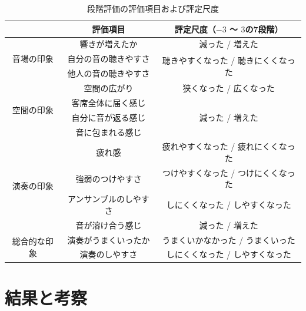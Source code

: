 \documentclass[11pt,a4j]{jreport}
\begin{document}
\vspace{1\baselineskip}

\begin{table}[H]
  \centering
  \caption{段階評価の評価項目および評定尺度}
  \label{tab:段階評価の評価項目および評定尺度}

  \begingroup
  \renewcommand{\arraystretch}{1.2}
  \begin{tabular}{c|c|c}
    & 評価項目 & 評定尺度（$-3$ 〜 $3$の7段階） \\
    \hline \hline

    \multirow{3}{*}{音場の印象} & 響きが増えたか & 減った / 増えた \\
    \cline{2-3}
    & 自分の音の聴きやすさ & \multirow{2}{*}{聴きやすくなった / 聴きにくくなった}\\
    \cline{2-2}
    & 他人の音の聴きやすさ & \\
    \hline \hline

    \multirow{4}{*}{空間の印象} & 空間の広がり & 狭くなった / 広くなった \\
    \cline{2-3}
    & 客席全体に届く感じ & \multirow{3}{*}{減った / 増えた} \\
    \cline{2-2}
    & 自分に音が返る感じ & \\
    \cline{2-2}
    & 音に包まれる感じ & \\
    \hline \hline

    \multirow{4}{*}{演奏の印象} & 疲れ感 & 疲れやすくなった / 疲れにくくなった \\
    \cline{2-3}
    & 強弱のつけやすさ & つけやすくなった / つけにくくなった \\
    \cline{2-3}
    & アンサンブルのしやすさ & しにくくなった / しやすくなった\\
    \cline{2-3}
    & 音が溶け合う感じ & 減った / 増えた \\
    \hline \hline

    \multirow{2}{*}{総合的な印象} & 演奏がうまくいったか & うまくいかなかった / うまくいった \\
    \cline{2-3}
    & 演奏のしやすさ & しにくくなった / しやすくなった \\
    \hline

  \end{tabular}
  \endgroup
\end{table}

\clearpage
\section{結果と考察}
\end{document}
